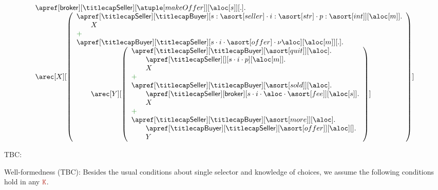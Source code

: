 \begin{example}[Auction]
\[
  \begin{array}{l}
    \apref[\ptp {broker}][\amulti {Seller}][{\atuple[makeOffer]}][{\aloc[s]}][.].
    \\  	
    \arec[X][\left({
    \begin{array}{l}
      \apref[\amulti{Seller}][\amulti {Buyer}][s:{\asort[seller]} \cdot {i:{\asort[str]} \cdot p:{\asort[int]}}][{\aloc[m]}].
      \\\qquad
      X
      \\
      \chop
      \\
      \apref[\amulti {Buyer}][\amulti {Seller}][s \cdot i \cdot {\asort[offer]} \cdot \nu \aloc][{\aloc[m]}][.].
      \\\qquad
      \arec[Y][\left({
      \begin{array}{l}
	\apref[\amulti {Seller}][\amulti {Buyer}][{\asort[quit]}][\aloc].
	\\\qquad
	\apref[\amulti {Seller}][][s \cdot i \cdot p][{\aloc[m]}].
        \\
        \qquad
        X
        \\
        \chop
	\\
        \apref[\amulti{Seller}][\amulti {Buyer}][{\asort[sold]}][\aloc].
        \\\qquad
        \apref[\amulti{Seller}][\ptp{broker}][s \cdot i \cdot \aloc \cdot {\asort[fee]}][{\aloc[s]}].        
        \\
        \qquad
        X
	\\
        \chop
	\\
        \apref[\amulti {Seller}][\amulti {Buyer}][{\asort[more]}][\aloc].
        \\
        \qquad\apref[\amulti {Buyer}][\amulti {Seller}][{\asort[offer]}][{\aloc}][].
	\\
        \qquad	
	Y
      \end{array}
      } \right)]
    \end{array}
    }\right)]
    \\
  \end{array}
\]
\finex
\end{example}

TBC: 

Well-formedness (TBC): Besides the usual conditions about single selector and knowledge of 
choices,  we assume the following conditions hold in any $\aK$.

